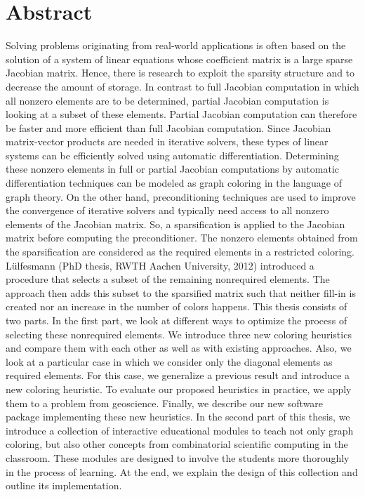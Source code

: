 \documentclass[12pt, twoside,a4paper,toc=bibliography]{scrbook}
\begin{document}
\chapter*{Abstract}
Solving problems originating from real-world applications is often based on the solution of a
system of linear equations whose coefficient matrix is a large sparse Jacobian matrix. Hence, there is
research to exploit the sparsity structure and to decrease the amount of storage. In contrast to full
Jacobian computation in which all nonzero elements are to be determined, partial Jacobian
computation is looking at a subset of these elements. Partial Jacobian computation can therefore
be faster and more efficient than full Jacobian computation. Since Jacobian matrix-vector products
are needed in iterative solvers, these types of linear systems can be efficiently solved using
automatic differentiation. Determining these nonzero elements in full or partial Jacobian
computations by automatic differentiation techniques can be modeled as graph coloring in the
language of graph theory.
%
On the other hand, preconditioning techniques are used to improve the convergence of iterative
solvers and typically need access to all nonzero elements of the Jacobian matrix. So, a sparsification
is applied to the Jacobian matrix before computing the preconditioner. The nonzero elements
obtained from the sparsification are considered as the required elements in a restricted coloring.
Lülfesmann (PhD thesis, RWTH Aachen University, 2012) introduced a procedure that selects a
subset of the remaining nonrequired elements. The approach then adds this subset to the
sparsified matrix such that neither fill-in is created nor an increase in the number of colors happens.
This thesis consists of two parts. In the first part, we look at different ways to optimize the process of
selecting these nonrequired elements. We introduce three new coloring heuristics and compare
them with each other as well as with existing approaches. Also, we look at a particular case in which
we consider only the diagonal elements as required elements. For this case, we generalize a
previous result  and introduce a new coloring heuristic. To evaluate our proposed heuristics in
practice, we apply them to a problem from geoscience. Finally, we describe our new software
package implementing these new heuristics. In the second part of this thesis, we introduce  a
collection of interactive educational modules to teach not only graph coloring, but also other
concepts from combinatorial scientific computing in the classroom. These modules are designed to
involve the students more thoroughly in the process of learning. At the end, we explain the design
of this collection and outline its implementation.
\end{document}
